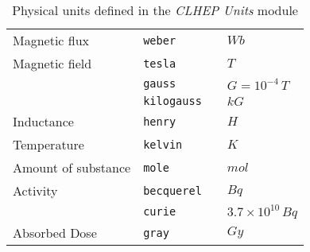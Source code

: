\begin{table}
\begin{tabular}{|l|l|l|l|}
Magnetic flux      &{\tt weber}         &              &$ Wb             $\\
Magnetic field     &{\tt tesla}         &              &$ T              $\\
                   &{\tt gauss}         &              &$ G=10^{-4}\,T   $\\
                   &{\tt kilogauss}     &              &$ kG             $\\
Inductance         &{\tt henry}         &              &$ H              $\\
Temperature        &{\tt kelvin}        &              &$ K              $\\
Amount of substance&{\tt mole}          &              &$ mol            $\\
Activity           &{\tt becquerel}     &              &$ Bq             $\\
                   &{\tt curie}         & &$ 3.7\times10^{10}\,Bq        $\\
Absorbed Dose      &{\tt gray}          &              &$ Gy             $\\
\hline
\end {tabular}
\caption{Physical units defined in the {\it CLHEP Units} module}
\label{tab1}
\end{table}

